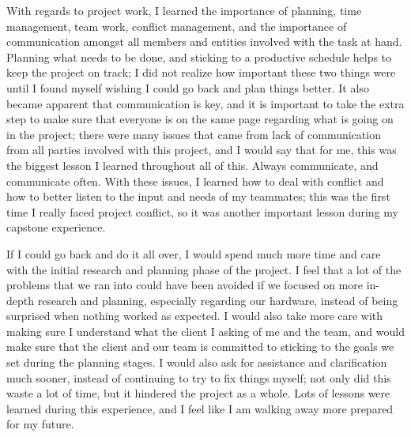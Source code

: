 \documentclass[IEEEtran,letterpaper,10pt,notitlepage,draftclsnofoot,onecolumn]{article}
\begin{document}
With regards to project work, I learned the importance of planning, time management, team work, conflict
management, and the importance of communication amongst all members and entities involved with the task at
hand. Planning what needs to be done, and sticking to a productive schedule helps to keep the project on
track; I did not realize how important these two things were until I found myself wishing I could go back
and plan things better. It also became apparent that communication is key, and it is important to take the
extra step to make sure that everyone is on the same page regarding what is going on in the project; there
were many issues that came from lack of communication from all parties involved with this project, and I would
say that for me, this was the biggest lesson I learned throughout all of this. Always communicate, and
communicate often. With these issues, I learned how to deal with conflict and how to better listen to the
input and needs of my teammates; this was the first time I really faced project conflict, so it was another
important lesson during my capstone experience.

If I could go back and do it all over, I would spend much more time and care with the initial research and
planning phase of the project. I feel that a lot of the problems that we ran into could have been avoided if
we focused on more in-depth research and planning, especially regarding our hardware, instead of being
surprised when nothing worked as expected. I would also take more care with making sure I understand what the
client I asking of me and the team, and would make sure that the client and our team is committed to sticking
to the goals we set during the planning stages. I would also ask for assistance and clarification much sooner,
instead of continuing to try to fix things myself; not only did this waste a lot of time, but it hindered
the project as a whole. Lots of lessons were learned during this experience, and I feel like I am walking
away more prepared for my future.
\end{document}
